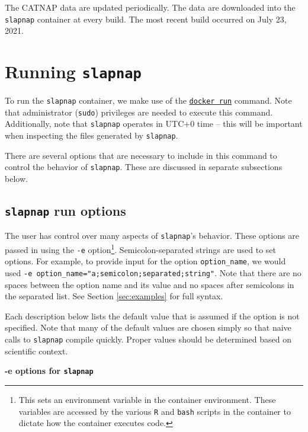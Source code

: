 \documentclass[
]{article}
\begin{document}
The CATNAP data are updated periodically. The data are downloaded into the \texttt{slapnap} container at every build. The most recent build occurred on July 23, 2021.

\hypertarget{sec:runningcontainer}{%
\section{\texorpdfstring{Running \texttt{slapnap}}{Running slapnap}}\label{sec:runningcontainer}}

To run the \texttt{slapnap} container, we make use of the \href{https://docs.docker.com/engine/reference/run/}{\texttt{docker\ run}} command. Note that administrator (\texttt{sudo}) privileges are needed to execute this command. Additionally, note that \texttt{slapnap} operates in UTC+0 time -- this will be important when inspecting the files generated by \texttt{slapnap}.

There are several options that are necessary to include in this command to control the behavior of \texttt{slapnap}. These are discussed in separate subsections below.

\hypertarget{sec:opts}{%
\subsection{\texorpdfstring{\texttt{slapnap} run options}{slapnap run options}}\label{sec:opts}}

The user has control over many aspects of \texttt{slapnap}'s behavior. These options are passed in using the \texttt{-e} option\footnote{This sets an environment variable in the container environment. These variables are accessed by the various \texttt{R} and \texttt{bash} scripts in the container to dictate how the container executes code.}. Semicolon-separated strings are used to set options. For example, to provide input for the option \texttt{option\_name}, we would used \texttt{-e\ option\_name="a;semicolon;separated;string"}. Note that there are no spaces between the option name and its value and no spaces after semicolons in the separated list. See Section \ref{sec:examples} for full syntax.

Each description below lists the default value that is assumed if the option is not specified. Note that many of the default values are chosen simply so that naive calls to \texttt{slapnap} compile quickly. Proper values should be determined based on scientific context.

\textbf{-e options for \texttt{slapnap}}
\end{document}
